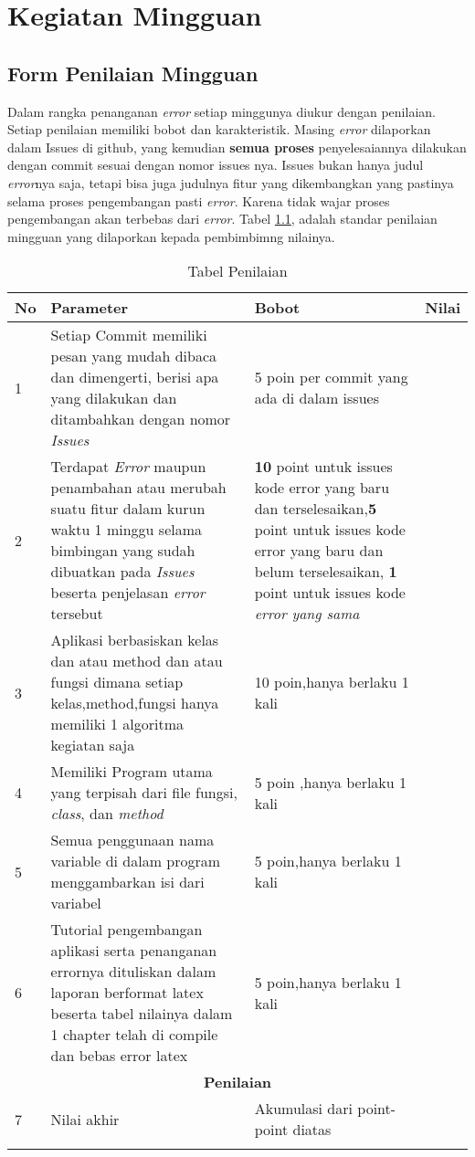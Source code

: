 \chapter{Kegiatan Mingguan}

\section{Form Penilaian Mingguan}
\par
Dalam rangka penanganan \textit{error} setiap minggunya diukur dengan penilaian. Setiap penilaian memiliki bobot dan karakteristik. 
Masing \textit{error} dilaporkan dalam Issues di github, yang kemudian \textbf{semua proses} penyelesaiannya dilakukan dengan commit sesuai dengan nomor issues nya.
Issues bukan hanya judul \textit{error}nya saja, tetapi bisa juga judulnya fitur yang dikembangkan yang pastinya selama proses pengembangan pasti \textit{error}.
Karena tidak wajar proses pengembangan akan terbebas dari \textit{error}. Tabel \ref{table:penilaian}, adalah standar penilaian mingguan yang dilaporkan kepada pembimbimng nilainya.

 \begin{longtable}
{|p{}|p{}|p{}|p{}|}
\caption{Tabel Penilaian}\\
\hline
No&Parameter&Bobot&Nilai\\
\hline
1 &Setiap Commit memiliki pesan yang mudah dibaca dan dimengerti, berisi apa yang dilakukan dan ditambahkan dengan nomor \textit{Issues}&5 poin per commit yang ada di dalam issues& \\ \hline
2 &Terdapat \textit{Error} maupun penambahan atau merubah suatu fitur dalam kurun waktu 1 minggu selama bimbingan yang sudah dibuatkan pada \textit{Issues} beserta penjelasan \textit{error} tersebut&\textbf{10} point untuk issues kode error yang baru dan terselesaikan,\textbf{5} point untuk issues kode error yang baru dan belum terselesaikan, \textbf{1} point untuk issues kode \textit{error yang sama}& \\ \hline
3 &Aplikasi berbasiskan kelas dan atau method dan atau fungsi dimana setiap kelas,method,fungsi hanya memiliki 1 algoritma kegiatan saja&10 poin,hanya berlaku 1 kali & \\ \hline
4 &Memiliki Program utama yang terpisah dari file fungsi, \textit{class}, dan \textit{method}&5 poin ,hanya berlaku 1 kali & \\ \hline
5 &Semua penggunaan nama variable di dalam program menggambarkan isi dari variabel& 5 poin,hanya berlaku 1 kali& \\ \hline
6 &Tutorial pengembangan aplikasi serta penanganan errornya dituliskan dalam laporan berformat latex beserta tabel nilainya dalam 1 chapter telah di compile dan bebas error latex & 5 poin,hanya berlaku 1 kali& \\ \hline
\multicolumn{4}{c}{\textbf{Penilaian}}\\ \hline

7 &Nilai akhir&Akumulasi dari point-point diatas & \\ \hline

\label{table:penilaian}
\end{longtable}

